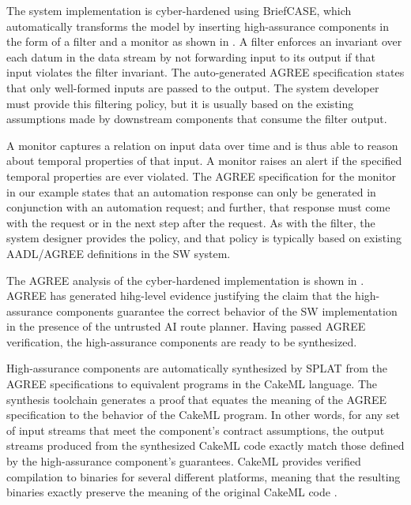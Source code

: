 The system implementation is cyber-hardened using BriefCASE, which automatically transforms the model by inserting high-assurance components in the form of a filter and a monitor as shown in .
A filter enforces an invariant over each datum in the data stream by not forwarding input to its output if that input violates the filter invariant.
The auto-generated AGREE specification states that only well-formed inputs are passed to the output.
The system developer must provide this filtering policy, but it is usually based on the existing assumptions made by downstream components that consume the filter output.

A monitor captures a relation on input data over time and is thus able to reason about temporal properties of that input.
A monitor raises an alert if the specified temporal properties are ever violated.
The AGREE specification for the monitor in our example states that an automation response can only be generated in conjunction with an automation request; and further, that response must come with the request or in the next step after the request.
As with the filter, the system designer provides the policy, and that policy is typically based on existing AADL/AGREE definitions in the SW system.

The AGREE analysis of the cyber-hardened implementation is shown in
. AGREE has generated hihg-level
evidence justifying the claim that the high-assurance components
guarantee the correct behavior of the SW implementation in the
presence of the untrusted AI route planner.  Having passed AGREE
verification, the high-assurance components are ready to be
synthesized.

High-assurance components are automatically synthesized by SPLAT from
the AGREE specifications to equivalent programs in the CakeML
language.  The synthesis toolchain generates a proof that equates the
meaning of the AGREE specification to the behavior of the CakeML
program.  In other words, for any set of input streams that meet the
component's contract assumptions, the output streams produced from the
synthesized CakeML code exactly match those defined by the
high-assurance component's guarantees.  CakeML provides verified
compilation to binaries for several different platforms, meaning that
the resulting binaries exactly preserve the meaning of the original
CakeML code \cite{cakeml}.

